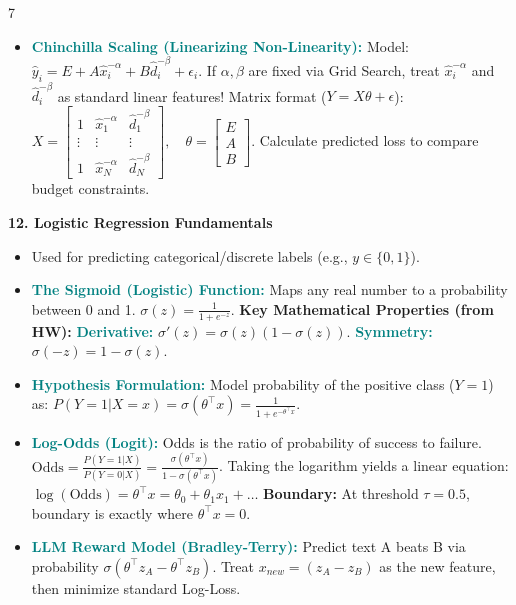 \documentclass{article}
\newcommand{\hlhighlight}[1]{\par\vspace{1.5pt}\noindent\colorbox{yellow!50}{\parbox{\dimexpr\columnwidth-2\fboxsep\relax}{\textbf{#1}}}\par\vspace{0.5pt}}
\newcommand{\sectitle}[1]{\par\textbf{\color{blue!70!black}{#1}}\par}
\newcommand{\concept}[1]{\textcolor{teal}{\textbf{#1}}}
\newcommand{\lbl}[1]{\textcolor{green!60!black}{\textbf{#1}}}
\begin{document}
\begin{multicols}{7}
\begin{itemize}
    \item \concept{Chinchilla Scaling (Linearizing Non-Linearity):} Model: $\hat{y}_i = E + A \hat{x}_i^{-\alpha} + B \hat{d}_i^{-\beta} + \epsilon_i$. If $\alpha, \beta$ are fixed via Grid Search, treat $\hat{x}_i^{-\alpha}$ and $\hat{d}_i^{-\beta}$ as standard linear features! Matrix format ($Y = X\theta + \epsilon$): $X = \begin{bmatrix} 1 & \hat{x}_1^{-\alpha} & \hat{d}_1^{-\beta} \\ \vdots & \vdots & \vdots \\ 1 & \hat{x}_N^{-\alpha} & \hat{d}_N^{-\beta} \end{bmatrix}, \quad \theta = \begin{bmatrix} E \\ A \\ B \end{bmatrix}$. Calculate predicted loss to compare budget constraints.
\end{itemize}

\hlhighlight{12. Logistic Regression Fundamentals}
\sectitle{Classification Models}
\begin{itemize}
    \item Used for predicting categorical/discrete labels (e.g., $y \in \{0, 1\}$).
    \item \concept{The Sigmoid (Logistic) Function:} Maps any real number to a probability between 0 and 1. $\sigma(z) = \frac{1}{1 + e^{-z}}$. \lbl{Key Mathematical Properties (from HW):} \concept{Derivative:} $\sigma'(z) = \sigma(z)(1 - \sigma(z))$. \concept{Symmetry:} $\sigma(-z) = 1 - \sigma(z)$.
    \item \concept{Hypothesis Formulation:} Model probability of the positive class ($Y=1$) as: $P(Y=1 | X=x) = \sigma(\theta^\top x) = \frac{1}{1 + e^{-\theta^\top x}}$.
    \item \concept{Log-Odds (Logit):} Odds is the ratio of probability of success to failure. $\text{Odds} = \frac{P(Y=1|X)}{P(Y=0|X)} = \frac{\sigma(\theta^\top x)}{1-\sigma(\theta^\top x)}$. Taking the logarithm yields a linear equation: $\log(\text{Odds}) = \theta^\top x = \theta_0 + \theta_1 x_1 + \dots$ \lbl{Boundary:} At threshold $\tau=0.5$, boundary is exactly where $\theta^\top x = 0$.
    \item \concept{LLM Reward Model (Bradley-Terry):} Predict text A beats B via probability $\sigma(\theta^\top z_A - \theta^\top z_B)$. Treat $x_{new} = (z_A - z_B)$ as the new feature, then minimize standard Log-Loss.
\end{itemize}


\end{multicols}
\end{document}
